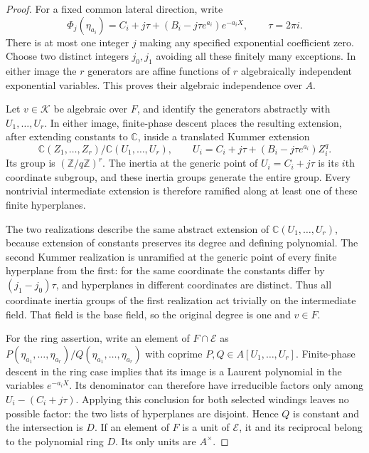 \documentclass[11pt,a4paper]{article}
\numberwithin{equation}{section}
\theoremstyle{definition}
\theoremstyle{remark}
\begin{document}
\begin{proof}
For a fixed common lateral direction, write
\[
 \Phi_j(\eta_{a_i})=C_i+j\tau+(B_i-j\tau e^{a_i})e^{-a_iX},
 \qquad \tau=2\pi i.
\]
There is at most one integer $j$ making any specified exponential
coefficient zero.  Choose two distinct integers $j_0,j_1$ avoiding all
these finitely many exceptions.  In either image the $r$ generators
are affine functions of $r$ algebraically independent exponential
variables.  This proves their algebraic independence over $A$.

Let $v\in\mathcal K$ be algebraic over $F$, and identify the generators
abstractly with $U_1,\ldots,U_r$.  In either image, finite-phase descent
places the resulting extension, after extending constants to
$\mathbb C$, inside a translated Kummer extension
\[
 \mathbb C(Z_1,\ldots,Z_r)/\mathbb C(U_1,\ldots,U_r),
 \qquad
 U_i=C_i+j\tau+(B_i-j\tau e^{a_i})Z_i^q.
\]
Its group is $(\mathbb Z/q\mathbb Z)^r$.  The inertia at the generic
point of $U_i=C_i+j\tau$ is its $i$th coordinate subgroup, and these
inertia groups generate the entire group.  Every nontrivial
intermediate extension is therefore ramified along at least one of
these finite hyperplanes.

The two realizations describe the same abstract extension of
$\mathbb C(U_1,\ldots,U_r)$, because extension of constants preserves
its degree and defining polynomial.  The second Kummer realization
is unramified at the generic point of every finite hyperplane from
the first: for the same coordinate the constants differ by
$(j_1-j_0)\tau$, and hyperplanes in different coordinates are distinct.
Thus all coordinate inertia groups of the first realization act
trivially on the intermediate field.  That field is the base field,
so the original degree is one and $v\in F$.

For the ring assertion, write an element of $F\cap\mathcal E$ as
$P(\eta_{a_1},\ldots,\eta_{a_r})/
 Q(\eta_{a_1},\ldots,\eta_{a_r})$ with coprime $P,Q\in A[U_1,\ldots,U_r]$.
Finite-phase descent in the ring case implies that its image is a
Laurent polynomial in the variables $e^{-a_iX}$.  Its denominator
can therefore have irreducible factors only among
$U_i-(C_i+j\tau)$.  Applying this conclusion for both selected
windings leaves no possible factor: the two lists of hyperplanes
are disjoint.  Hence $Q$ is constant and the intersection is $D$.
If an element of $F$ is a unit of $\mathcal E$, it and its reciprocal
belong to the polynomial ring $D$.  Its only units are $A^\times$.
\end{proof}
\end{document}
